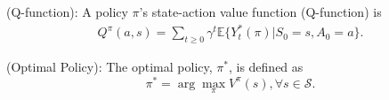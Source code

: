 \begin{definition} (Q-function): 
A policy $\pi$'s state-action value function (Q-function) is  
\begin{eqnarray*}
	Q^{\pi}(a,s)=\sum_{t\ge 0} \gamma^t \mathbb{E} \{Y_t^*(\pi)|S_0=s, A_0 = a\}. 
\end{eqnarray*}
\end{definition}

\begin{definition}(Optimal Policy):
The optimal policy, $\pi^*$, is defined as $$\pi^* = \arg \max_{\pi} V^\pi(s), \forall s \in \mathcal{S}.$$
\end{definition}













